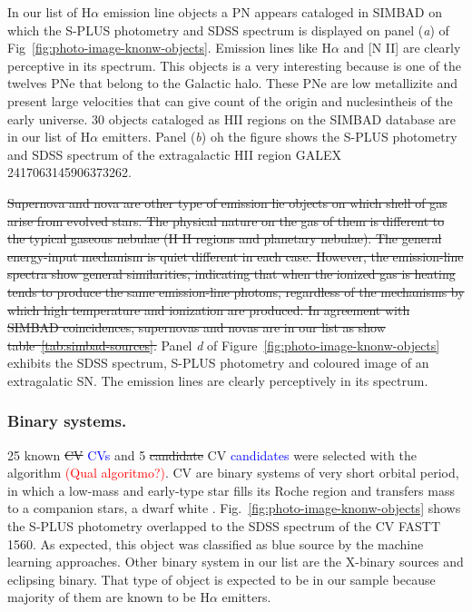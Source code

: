 \documentclass[fleqn,usenatbib]{mnras}
\newcommand{\rlopes}[1]{\textcolor{blue}{#1}}
\newcommand{\comment}[1]{\textcolor{red}{#1}}
\begin{document}
In our list of H{$\alpha$} emission line objects a PN appears cataloged in SIMBAD 
on which the S-PLUS photometry and SDSS spectrum is displayed on panel (\textit{a}) 
of Fig~\ref{fig:photo-image-knonw-objects}. Emission lines like H{$\alpha$} 
and [N II] are clearly perceptive in its spectrum.
This objects is a very interesting because is one of the twelves PNe that belong
to the Galactic halo. These PNe are low metallizite and present large velocities that
can give count of the origin and nuclesintheis of the early universe. 30 objects 
cataloged as HII regions on the SIMBAD database are in our list of H{$\alpha$} emitters. 
Panel (\textit{b}) oh the figure shows the S-PLUS photometry and SDSS spectrum 
of the extragalactic HII region GALEX 2417063145906373262.  

\sout{Supernova and nova are other type of emission lie objects on which shell of gas arise from
evolved stars. The physical nature on the gas of them is different to the typical gaseous 
nebulae (H II regions and planetary nebulae). The general energy-input mechanism is quiet 
different in each case. 
However, the emission-line spectra show general similarities, indicating that when the 
ionized gas is heating tends to produce the same emission-line photons, regardless 
of the mechanisms by which high temperature and ionization are produced. 
In agreement with SIMBAD coincidences, supernovas and novas are 
in our list as show table~\ref{tab:simbad-sources}.}
Panel \textit{d} of
Figure~\ref{fig:photo-image-knonw-objects} exhibits the SDSS spectrum, S-PLUS 
photometry and coloured image of an extragalatic SN. The emission lines are 
clearly perceptively in its spectrum. 

\subsubsection{Binary systems.}
25 known \sout{CV} \rlopes{CVs} and 5 \sout{candidate} CV \rlopes{candidates} were selected with the algorithm \comment{(Qual algoritmo?)}.
CV are binary systems of very short orbital period, in which a low-mass and
early-type star fills its Roche region and transfers mass to a companion stars,
a dwarf white \citep{Patterson:1984}. Fig.~\ref{fig:photo-image-knonw-objects} 
shows the S-PLUS photometry overlapped to the SDSS spectrum of the CV FASTT 1560. 
As expected, this object was classified as blue source by the machine learning approaches.
Other binary system in our list are the X-binary sources and eclipsing binary. 
That type of object is expected to be in our sample because majority of them
are known to be H{$\alpha$} emitters.
\end{document}
